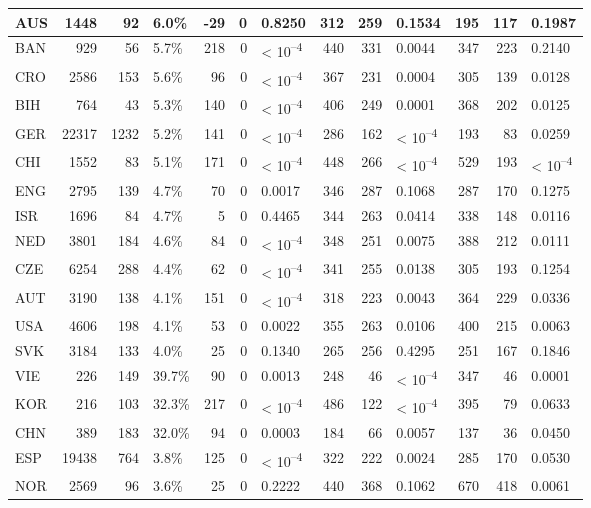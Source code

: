 \begin{tabular}{l|r|r|l|r|r|l|r|r|l|r|r|l}
\hline
AUS & 1448 & 92 & 6.0\% & -29 & 0 & 0.8250 & 312 & 259 & 0.1534 & 195 & 117 & 0.1987\\
\hline
BAN & 929 & 56 & 5.7\% & 218 & 0 & < 10\textsuperscript{--4} & 440 & 331 & 0.0044 & 347 & 223 & 0.2140\\
\hline
CRO & 2586 & 153 & 5.6\% & 96 & 0 & < 10\textsuperscript{--4} & 367 & 231 & 0.0004 & 305 & 139 & 0.0128\\
\hline
BIH & 764 & 43 & 5.3\% & 140 & 0 & < 10\textsuperscript{--4} & 406 & 249 & 0.0001 & 368 & 202 & 0.0125\\
\hline
GER & 22317 & 1232 & 5.2\% & 141 & 0 & < 10\textsuperscript{--4} & 286 & 162 & < 10\textsuperscript{--4} & 193 & 83 & 0.0259\\
\hline
CHI & 1552 & 83 & 5.1\% & 171 & 0 & < 10\textsuperscript{--4} & 448 & 266 & < 10\textsuperscript{--4} & 529 & 193 & < 10\textsuperscript{--4}\\
\hline
ENG & 2795 & 139 & 4.7\% & 70 & 0 & 0.0017 & 346 & 287 & 0.1068 & 287 & 170 & 0.1275\\
\hline
ISR & 1696 & 84 & 4.7\% & 5 & 0 & 0.4465 & 344 & 263 & 0.0414 & 338 & 148 & 0.0116\\
\hline
NED & 3801 & 184 & 4.6\% & 84 & 0 & < 10\textsuperscript{--4} & 348 & 251 & 0.0075 & 388 & 212 & 0.0111\\
\hline
CZE & 6254 & 288 & 4.4\% & 62 & 0 & < 10\textsuperscript{--4} & 341 & 255 & 0.0138 & 305 & 193 & 0.1254\\
\hline
AUT & 3190 & 138 & 4.1\% & 151 & 0 & < 10\textsuperscript{--4} & 318 & 223 & 0.0043 & 364 & 229 & 0.0336\\
\hline
USA & 4606 & 198 & 4.1\% & 53 & 0 & 0.0022 & 355 & 263 & 0.0106 & 400 & 215 & 0.0063\\
\hline
SVK & 3184 & 133 & 4.0\% & 25 & 0 & 0.1340 & 265 & 256 & 0.4295 & 251 & 167 & 0.1846\\
\hline
VIE & 226 & 149 & 39.7\% & 90 & 0 & 0.0013 & 248 & 46 & < 10\textsuperscript{--4} & 347 & 46 & 0.0001\\
\hline
KOR & 216 & 103 & 32.3\% & 217 & 0 & < 10\textsuperscript{--4} & 486 & 122 & < 10\textsuperscript{--4} & 395 & 79 & 0.0633\\
\hline
CHN & 389 & 183 & 32.0\% & 94 & 0 & 0.0003 & 184 & 66 & 0.0057 & 137 & 36 & 0.0450\\
\hline
ESP & 19438 & 764 & 3.8\% & 125 & 0 & < 10\textsuperscript{--4} & 322 & 222 & 0.0024 & 285 & 170 & 0.0530\\
\hline
NOR & 2569 & 96 & 3.6\% & 25 & 0 & 0.2222 & 440 & 368 & 0.1062 & 670 & 418 & 0.0061\\

\end{tabular}

